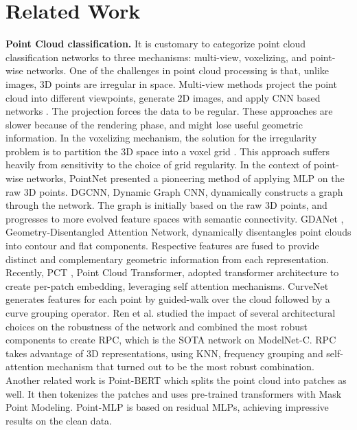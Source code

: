 \documentclass[10pt,twocolumn]{article}
\begin{document}
\section{Related Work}
\label{sec:related}
{\bf Point Cloud classification.} It is customary to categorize point cloud classification networks to three mechanisms: multi-view, voxelizing, and point-wise networks. One of the challenges in point cloud processing is that, unlike images, 3D points are irregular in space. Multi-view methods project the point cloud into different viewpoints, generate 2D images, and apply CNN based networks \cite{multi_view_and_voxel, simple_view}. The projection forces the data to be regular. These approaches are slower because of the rendering phase, and might lose useful geometric information.
In the voxelizing mechanism, the solution for the irregularity problem is to  partition the 3D space into a voxel grid \cite{multi_view_and_voxel, modelnet40, voxel2}. This approach suffers heavily from sensitivity to the choice of grid regularity.
In the context of point-wise networks, PointNet \cite{pointnet} presented a pioneering method of applying MLP on the raw 3D points.
DGCNN\cite{dgcnn}, Dynamic Graph CNN, dynamically constructs a graph through the network. The graph is initially based on the raw 3D points, and progresses to more evolved  feature spaces with semantic connectivity. 
GDANet \cite{gdanet}, Geometry-Disentangled Attention Network, dynamically disentangles point clouds into contour and flat
components. Respective features are fused to provide distinct and complementary geometric information from each representation. Recently, PCT \cite{pct}, Point Cloud Transformer, adopted transformer architecture \cite{attention_is_all_you_need}
to create per-patch embedding, leveraging self attention mechanisms. CurveNet\cite{curvenet} generates features for each point by guided-walk over the cloud followed by a curve grouping operator.
Ren et al.\cite{modelnetc} studied the impact of several architectural choices on the robustness of the network and combined the most robust components to create RPC, which is the SOTA network on ModelNet-C. RPC takes advantage of 3D representations, using KNN, frequency grouping and self-attention mechanism that turned out to be the most robust combination. Another related work is Point-BERT\cite{pointbert} which splits the point cloud into patches as well. It then tokenizes the patches and uses pre-trained transformers with Mask Point Modeling. Point-MLP\cite{point_mlp} is based on residual MLPs, achieving impressive results on the clean data.
\end{document}
